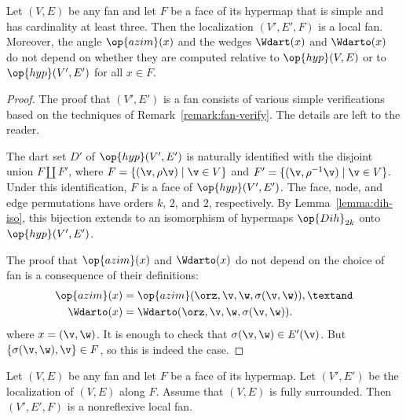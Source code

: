 \begin{lemma}[localization]%
\label{lemma:localization}
Let $(V,E)$ be any fan and let $F$ be a face of its hypermap that is
simple and has cardinality at least three.  Then the localization
$(V',E',F)$ is a local fan.  Moreover, the angle $\op{azim}(x)$ and
the wedges $\Wdart(x)$ and $\Wdarto(x)$ do not depend on whether they
are computed relative to $\op{hyp}(V,E)$ or to $\op{hyp}(V',E')$ for
all $x\in F$.
\end{lemma}



\begin{proof}
The proof that $(V',E')$ is a fan consists of various simple
verifications based on the techniques of
Remark~\ref{remark:fan-verify}.  The details are left to the reader.

The dart set $D'$ of $\op{hyp}(V',E')$ is naturally identified with
the disjoint union $F\coprod F'$, where $F = \{(\v,\rho\v) \mid \v\in
V\}$ and $F'=\{(\v,\rho^{-1}\v) \mid \v\in V\}$.  Under this
identification, $F$ is a face of $\op{hyp}(V',E')$.  The face, node,
and edge permutations have orders $k$, $2$, and $2$, respectively.  By
Lemma~\ref{lemma:dih-iso}, this bijection extends to an isomorphism of
hypermaps $\op{Dih}_{2k}$ onto $\op{hyp}(V',E')$.

The proof that  $\op{azim}(x)$ and $\Wdarto(x)$ do not depend on the
choice of fan is a consequence of their definitions:
\begin{align*}
\op{azim}(x) &= \op{azim}(\orz,\v,\w,\sigma(\v,\w)),\textand \\
\Wdarto(x) &= \Wdarto(\orz,\v,\w,\sigma(\v,\w)).\\
\end{align*}
where $x = (\v,\w)$.  It is enough to check that $\sigma(\v,\w)\in
E'(\v)$.  But $\{\sigma(\v,\w),\v\}\in F$, so this is indeed the case.
\end{proof}

\begin{lemma}[]\cutrate{}\label{lemma:localize-nonreflexive} 
Let $(V,E)$ be any fan and
  let $F$ be a face of its hypermap.  Let $(V',E')$ be the
  localization of $(V,E)$ along $F$.  Assume that $(V,E)$ is fully surrounded.
  Then $(V',E',F)$ is a nonreflexive local fan.
\end{lemma}

